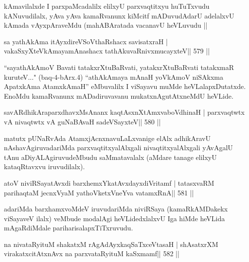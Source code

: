 \begin{artha}
kAmavilalxde I parxpaMcadalilx elilxyU parxvaqtitxyu huTuTxvudu
kANuvudilalx, yAva yAva kamaRvanunx kiMcitf mADuvudAdarU adelalxvU
kAmada vAyxpAraveMdu (mahABAratada vacanavU heVLuvudu || 
\end{artha}



\begin{shl}
sa yathAkAma itAyxdireVSoV\s thaRshacx savisatxraH |
vakaSxyXteV\s kAmayamAnashacx tathA\s kuvaRnivxmucayxteV\hfill || 579 ||
\end{shl}

\begin{artha}
``sayathAkAmoV Bavati tatakxrXtuBaRvati, yatakxrXtuBaRvati tatakxmaR
  kuruteV..." (baq-4-bArx.4) ``athA\s kAmaya mAnaH yoV\s kAmoV
  niSAkxma ApatxkAma AtamxkAmaH'' eMbuvalilx I viSayavu muMde
  heVLalapxDutatxde. EnoMdu kamaRvanunx mADadiruvavanu
  mukatxnAgutAtxneMdU heVLide.
\end{artha}

\begin{shl}
savARdhikAraparxdhavxMsAnanx kaqtAsxnXtAmxvaboVdhinaH |
parxvaqtwtx vA nivaqtwtx vA guNaBAvaH sadeVSayxteV\hfill || 580 ||
\end{shl}

\begin{artha}
matutx pUNaRvAda AtamxjAcnxnavuLaLxvanige elAlx adhikAravU nAshavAgiruvadariMda parxvaqtitxyalAlxgali nivaqtitxyalAlxgali yAvAgalU tAnu aDiyALAgiruvudeMbudu saMmatavalalx (aMdare tanage elilxyU kataqRtavxvu iruvudilalx).
\end{artha}

\begin{shl}
atoV niviRSayatAvxdi barxhemxYkatAvxdayxdiVritamf |
tatasxvaRM parihaqtaM jecnxVyaM yathoVketxVneYva vatamxRnA\hfill || 581 ||
\end{shl}

\begin{artha}
adariMda barxhamxvoMdeV iruvudariMda niviRSaya (kamaRkAMDakekx viSayaveV ilalx) veMbude modalAgi heVLidedxlalxvU Iga hiMde heVLida mAgaRdiMdale pariharisalapxTiTxruvudu.
\end{artha}



\begin{shl}
na nivataRyituM shakatxM rAgAdAyxkaqSaTxceVtasaH |
shAsatxrXM virakatxcitAtxnAvx na parxvataRyituM kaSxmamf\hfill || 582 ||
\end{shl}

